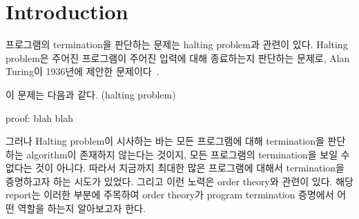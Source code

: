 \section{Introduction}
\label{sec:preliminaries}
프로그램의 termination을 판단하는 문제는 halting problem과 관련이 있다.
Halting problem은 주어진 프로그램이 주어진 입력에 대해 종료하는지 판단하는 문제로, Alan Turing이 1936년에 제안한 문제이다~\cite{turing}.

이 문제는 다음과 같다.
(halting problem)

proof: blah blah

그러나 Halting problem이 시사하는 바는 모든 프로그램에 대해 termination을 판단하는 algorithm이 존재하지 않는다는 것이지, 모든 프로그램의 termination을 보일 수 없다는 것이 아니다.
따라서 지금까지 최대한 많은 프로그램에 대해서 termination을 증명하고자 하는 시도가 있었다.
그리고 이런 노력은 order theory와 관련이 있다.
해당 report는 이러한 부분에 주목하여 order theory가 program termination 증명에서 어떤 역할을 하는지 알아보고자 한다.